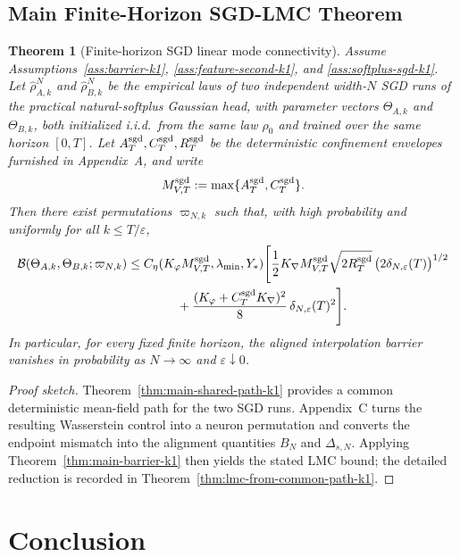 \documentclass[11pt]{article}
\newtheorem{theorem}{Theorem}
\theoremstyle{definition}
\newcommand{\cB}{\mathcal{B}}
\begin{document}
\subsection{Main Finite-Horizon SGD-LMC Theorem}

\begin{theorem}[Finite-horizon SGD linear mode connectivity]
\label{thm:main-sgd-lmc-k1}
Assume Assumptions~\ref{ass:barrier-k1}, \ref{ass:feature-second-k1}, and
\ref{ass:softplus-sgd-k1}. Let $\hat\rho_{A,k}^N$ and $\hat\rho_{B,k}^N$ be the
empirical laws of two independent width-$N$ SGD runs of the practical
natural-softplus Gaussian head, with parameter vectors $\Theta_{A,k}$ and
$\Theta_{B,k}$, both initialized i.i.d.\ from the same law $\rho_0$ and
trained over the same horizon $[0,T]$.
Let
$A_T^{\rm sgd},C_T^{\rm sgd},R_T^{\rm sgd}$ be the deterministic confinement
envelopes furnished in Appendix~A, and write
\[
  M_{V,T}^{\rm sgd}:=\max\{A_T^{\rm sgd},C_T^{\rm sgd}\}.
\]
Then there exist permutations $\varpi_{N,k}$ such that, with high probability and
uniformly for all $k\le T/\varepsilon$,
\begin{align}
  \cB(\Theta_{A,k},\Theta_{B,k};\varpi_{N,k})
  &\le
  C_\eta(K_\varphi M_{V,T}^{\rm sgd},\lambda_{\min},Y_\ast)
  \Biggl[
    \frac12 K_{\nabla}M_{V,T}^{\rm sgd}\sqrt{2R_T^{\rm sgd}}\,
    \bigl(2\delta_{N,\varepsilon}(T)\bigr)^{1/2}
    \nonumber\\
  &\qquad\qquad
    +
    \frac{(K_\varphi+C_T^{\rm sgd}K_{\nabla})^2}{8}\,
    \delta_{N,\varepsilon}(T)^2
  \Biggr].
  \label{eq:main-sgd-lmc-k1}
\end{align}
In particular, for every fixed finite horizon, the aligned interpolation
barrier vanishes in probability as $N\to\infty$ and $\varepsilon\downarrow 0$.
\end{theorem}

\begin{proof}[Proof sketch]
Theorem~\ref{thm:main-shared-path-k1} provides a common deterministic
mean-field path for the two SGD runs. Appendix~C turns the resulting
Wasserstein control into a neuron permutation and converts the endpoint mismatch
into the alignment quantities $B_N$ and $\Delta_{s,N}$. Applying
Theorem~\ref{thm:main-barrier-k1} then yields the stated LMC bound; the
detailed reduction is recorded in Theorem~\ref{thm:lmc-from-common-path-k1}.
\end{proof}

\section{Conclusion}
\end{document}
